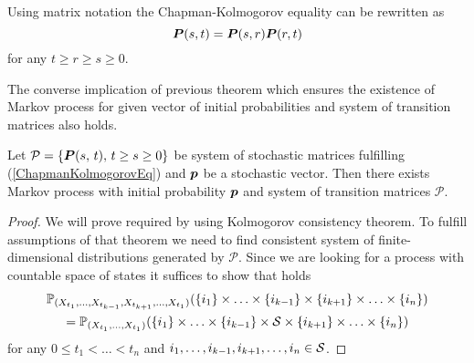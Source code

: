 {Using matrix notation the Chapman-Kolmogorov equality can be rewritten as
\[
	\m{P} (s, t) = \m{P} (s, r) \m{P} (r, t)
\]
for any $t \geq r \geq s \geq 0$.

The converse implication of previous theorem which ensures the existence of Markov process for given vector of initial probabilities and system of transition matrices also holds.

\begin{proposition}
	Let $\mathcal{P} = \transSys$ be system of stochastic matrices fulfilling (\ref{ChapmanKolmogorovEq}) and $\m{p}$ be a stochastic vector. Then there exists Markov process with initial probability $\m{p}$ and system of transition matrices $\mathcal{P}$.
\end{proposition}

\begin{proof}
	We will prove required by using Kolmogorov consistency theorem. To fulfill assumptions of that theorem we need to find consistent system of finite-dimensional distributions generated by $\mathcal{P}$. Since we are looking for a process with countable space of states it suffices to show that holds
	\begin{multline*}
		\pr_{(X_{t_1}, \ldots , X_{t_{k-1}}, X_{t_{k+1}}, \ldots , X_{t_1})} (\{i_1\} \times \ldots  \times \{i_{k-1}\} \times \{i_{k+1}\} \times \ldots  \times \{i_n\}) \\
		= \pr_{(X_{t_1}, \ldots , X_{t_1})} (\{i_1\} \times \ldots  \times \{i_{k-1}\} \times \S \times \{i_{k+1}\} \times \ldots  \times \{i_n\})
	\end{multline*}
	for any $0 \leq t_1 < \ldots < t_n$ and $i_1, \ldots, i_{k-1}, i_{k+1}, \ldots, i_n \in \S$. 
	

\end{proof}}

